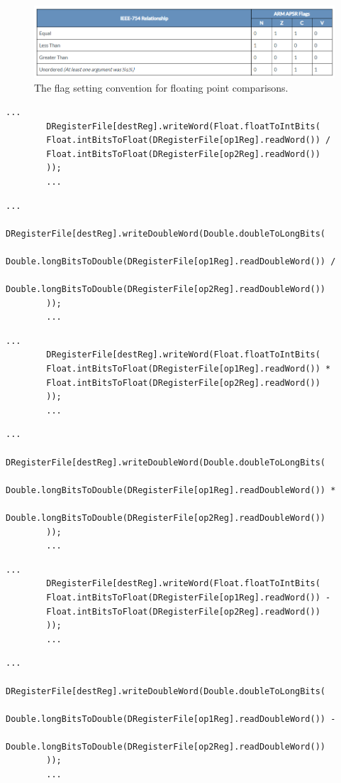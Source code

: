 	\begin{figure}[H]
		\centering
		\includegraphics[width=.8\textwidth]{img/ieee754_flags.png}
		\caption{The flag setting convention for floating point comparisons.}
	\end{figure}
	
	\begin{lstlisting}[caption={FDIVS}]
		...
		DRegisterFile[destReg].writeWord(Float.floatToIntBits(
		Float.intBitsToFloat(DRegisterFile[op1Reg].readWord()) /
		Float.intBitsToFloat(DRegisterFile[op2Reg].readWord())
		));
		...
	\end{lstlisting}
	\begin{lstlisting}[caption={FDIVD}]
		...
		DRegisterFile[destReg].writeDoubleWord(Double.doubleToLongBits(
		Double.longBitsToDouble(DRegisterFile[op1Reg].readDoubleWord()) /
		Double.longBitsToDouble(DRegisterFile[op2Reg].readDoubleWord())
		));
		...
	\end{lstlisting}
	\begin{lstlisting}[caption={FMULS}]
		...
		DRegisterFile[destReg].writeWord(Float.floatToIntBits(
		Float.intBitsToFloat(DRegisterFile[op1Reg].readWord()) *
		Float.intBitsToFloat(DRegisterFile[op2Reg].readWord())
		));
		...
	\end{lstlisting}
	\begin{lstlisting}[caption={FMULD}]
		...
		DRegisterFile[destReg].writeDoubleWord(Double.doubleToLongBits(
		Double.longBitsToDouble(DRegisterFile[op1Reg].readDoubleWord()) *
		Double.longBitsToDouble(DRegisterFile[op2Reg].readDoubleWord())
		));
		...
	\end{lstlisting}
	\begin{lstlisting}[caption={FSUBS}]
		...
		DRegisterFile[destReg].writeWord(Float.floatToIntBits(
		Float.intBitsToFloat(DRegisterFile[op1Reg].readWord()) -
		Float.intBitsToFloat(DRegisterFile[op2Reg].readWord())
		));
		...
	\end{lstlisting}
	\begin{lstlisting}[caption={FSUBD}]
		...
		DRegisterFile[destReg].writeDoubleWord(Double.doubleToLongBits(
		Double.longBitsToDouble(DRegisterFile[op1Reg].readDoubleWord()) -
		Double.longBitsToDouble(DRegisterFile[op2Reg].readDoubleWord())
		));
		...
	\end{lstlisting}
	
